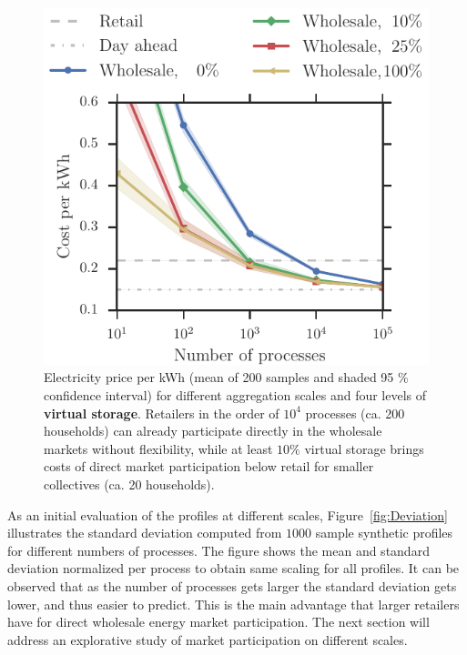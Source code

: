 \documentclass[conference]{IEEEtran}
\begin{document}
\begin{figure}[!t]
\centering
\includegraphics[width=0.9\columnwidth]{figures/Wholesale.pdf}
\caption{Electricity price per kWh (mean of 200 samples and shaded 95 \% confidence interval) for different aggregation scales and four levels of \textbf{virtual storage}. Retailers in the order of $10^4$ processes (ca. 200 households) can already participate directly in the wholesale markets without flexibility, while at least $10 \%$ virtual storage brings costs of direct market participation below retail for smaller collectives (ca. 20 households).}
\label{fig:wholesale}
\end{figure}


As an initial evaluation of the profiles at different scales, %
Figure~\ref{fig:Deviation} illustrates the standard deviation computed from $1000$ sample synthetic profiles for different numbers of processes. The figure shows the mean and standard deviation normalized per process to obtain same scaling for all profiles. It can be observed that as the number of processes gets larger the standard deviation gets lower, and thus easier to predict. This is the main advantage that larger retailers have for direct wholesale energy market participation. The next section will address an explorative study of market participation on different scales. %
\end{document}
